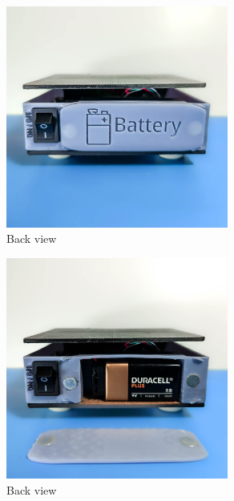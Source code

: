 \begin{figure}[H]
    \centering
    \includegraphics[width=0.65\textwidth]{medias/photos/back.jpg}
    \caption{Back view}
    \label{fig:immagine}
\end{figure}

\begin{figure}[H]
    \centering
    \includegraphics[width=0.65\textwidth]{medias/photos/back2.jpg}
    \caption{Back view}
    \label{fig:immagine}
\end{figure}
